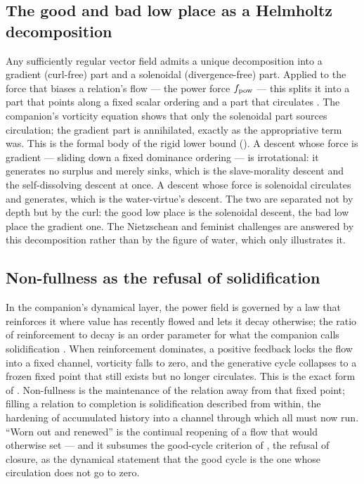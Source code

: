 \subsection{The good and bad low place as a Helmholtz decomposition}
\label{p20:sub:formal-lowbound}

Any sufficiently regular vector field admits a unique decomposition into a gradient (curl-free) part and a solenoidal (divergence-free) part. Applied to the force that biases a relation's flow --- the power force $f_{\mathrm{pow}}$ --- this splits it into a part that points along a fixed scalar ordering and a part that circulates \parencite{wan2026braid}. The companion's vorticity equation shows that only the solenoidal part sources circulation; the gradient part is annihilated, exactly as the appropriative term was. This is the formal body of the rigid lower bound (). A descent whose force is gradient --- sliding down a fixed dominance ordering --- is irrotational: it generates no surplus and merely sinks, which is the slave-morality descent and the self-dissolving descent at once. A descent whose force is solenoidal circulates and generates, which is the water-virtue's descent. The two are separated not by depth but by the curl: the good low place is the solenoidal descent, the bad low place the gradient one. The Nietzschean and feminist challenges are answered by this decomposition rather than by the figure of water, which only illustrates it.

\subsection{Non-fullness as the refusal of solidification}
\label{p20:sub:formal-solidification}

In the companion's dynamical layer, the power field is governed by a law that reinforces it where value has recently flowed and lets it decay otherwise; the ratio of reinforcement to decay is an order parameter for what the companion calls solidification \parencite{wan2026braid}. When reinforcement dominates, a positive feedback locks the flow into a fixed channel, vorticity falls to zero, and the generative cycle collapses to a frozen fixed point that still exists but no longer circulates. This is the exact form of . Non-fullness is the maintenance of the relation away from that fixed point; filling a relation to completion is solidification described from within, the hardening of accumulated history into a channel through which all must now run. ``Worn out and renewed'' is the continual reopening of a flow that would otherwise set --- and it subsumes the good-cycle criterion of \textcite{paperix}, the refusal of closure, as the dynamical statement that the good cycle is the one whose circulation does not go to zero.

